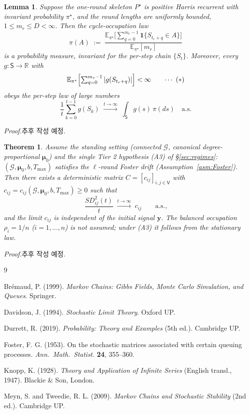\documentclass[11pt]{article}
\newtheorem{thm}{Theorem}
\newtheorem{lem}{Lemma}
\theoremstyle{definition}
\begin{document}
\begin{lem}
\label{lem:skeleton-step-lift}
Suppose the one-round skeleton $P^{\star}$ is positive Harris recurrent with invariant probability $\pi^{\star}$, and the round lengths are uniformly bounded, $1 \leq m_r \leq D < \infty$. Then the cycle-occupation law
\[
  \pi(A) \;:=\; \frac{\mathbb{E}_{\pi^{\star}}\bigl[\sum_{q=0}^{m_r-1}\mathbf{1}\{S_{t_r+q}\in A\}\bigr]}{\mathbb{E}_{\pi^{\star}}[m_r]}
\]
is a probability measure, invariant for the per-step chain $\{S_t\}$. Moreover, every $g \colon \mathsf{S} \to \mathbb{R}$ with
\[
  \mathbb{E}_{\pi^{\star}}\Bigl[\textstyle\sum_{q=0}^{m_r-1}|g(S_{t_r+q})|\Bigr] < \infty \tag*{$\cdots\ (\ast)$}
\]
obeys the per-step law of large numbers
\[
  \frac1t\sum_{k=0}^{t-1} g(S_k) \;\xrightarrow{t\to\infty}\; \int_{\mathsf{S}} g(s)\,\pi(ds) \quad\text{a.s.}
\]
\end{lem}
\noindent\emph{Proof.}\quad 추후 작성 예정.

\begin{thm}
\label{thm:balanced}
Assume the standing setting (connected $\mathcal{G}$, canonical degree-proportional $\boldsymbol{\mu}_0$) and the single Tier 2 hypothesis (A3) of \S\ref{sec:regimes}: $(\mathcal{G}, \boldsymbol{\mu}_0, b, T_{\max})$ satisfies the $\ell$-round Foster drift (Assumption~\ref{asm:Foster}).
Then there exists a deterministic matrix $C = [c_{ij}]_{i,j \in \mathsf{V}}$ with $c_{ij} = c_{ij}(\mathcal{G}, \boldsymbol{\mu}_0, b, T_{\max}) \geq 0$ such that
\[
  \frac{SD^2_{ij}(t)}{t} \;\xrightarrow{t \to \infty}\; c_{ij} \qquad \text{a.s.,}
\]
and the limit $c_{ij}$ is independent of the initial signal $\mathbf{y}$. The balanced occupation $\rho_i = 1/n$ ($i = 1, \ldots, n$) is \emph{not} assumed; under (A3) it follows from the stationary law.
\end{thm}

\noindent\emph{Proof.}\quad 추후 작성 예정.


\begin{thebibliography}{9}

 Br\'emaud, P. (1999). \textit{Markov Chains: Gibbs Fields, Monte Carlo Simulation, and Queues}. Springer.

 Davidson, J. (1994). \textit{Stochastic Limit Theory}. Oxford UP.

 Durrett, R. (2019). \textit{Probability: Theory and Examples} (5th ed.). Cambridge UP.

 Foster, F. G. (1953). On the stochastic matrices associated with certain queuing processes. \textit{Ann.\ Math.\ Statist.} \textbf{24}, 355--360.

 Knopp, K. (1928). \textit{Theory and Application of Infinite Series} (English transl., 1947). Blackie \& Son, London.

 Meyn, S. and Tweedie, R. L. (2009).
\textit{Markov Chains and Stochastic Stability} (2nd ed.). Cambridge UP.

\end{thebibliography}
\end{document}
